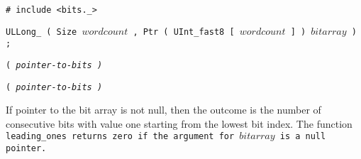 
\tt{# include <bits._>}

\tt{ULLong_} \s\s\tt{( Size} $wordcount$
\tt{, Ptr ( UInt_fast8 [} $wordcount$ \tt{] )} $bitarray$ \tt{) ;}

\s\s
\tt{(} \it{pointer-to-bits} \tt{)}

\s\s\s
\tt{(} \it{pointer-to-bits} \tt{)}


If pointer to the bit array is not null, then the outcome is the number
of consecutive bits with value one starting from the lowest bit index.
The function \tt{leading_ones} returns zero if
the argument for $bitarray$ is a null pointer.
